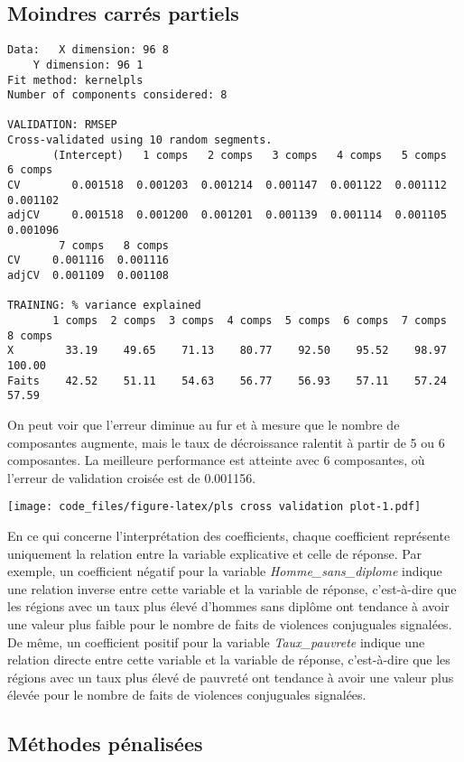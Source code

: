 \documentclass[
]{article}
\begin{document}
\hypertarget{moindres-carruxe9s-partiels}{%
\subsection{Moindres carrés
partiels}\label{moindres-carruxe9s-partiels}}

\begin{verbatim}
Data:   X dimension: 96 8 
    Y dimension: 96 1
Fit method: kernelpls
Number of components considered: 8

VALIDATION: RMSEP
Cross-validated using 10 random segments.
       (Intercept)   1 comps   2 comps   3 comps   4 comps   5 comps   6 comps
CV        0.001518  0.001203  0.001214  0.001147  0.001122  0.001112  0.001102
adjCV     0.001518  0.001200  0.001201  0.001139  0.001114  0.001105  0.001096
        7 comps   8 comps
CV     0.001116  0.001116
adjCV  0.001109  0.001108

TRAINING: % variance explained
       1 comps  2 comps  3 comps  4 comps  5 comps  6 comps  7 comps  8 comps
X        33.19    49.65    71.13    80.77    92.50    95.52    98.97   100.00
Faits    42.52    51.11    54.63    56.77    56.93    57.11    57.24    57.59
\end{verbatim}

On peut voir que l'erreur diminue au fur et à mesure que le nombre de
composantes augmente, mais le taux de décroissance ralentit à partir de
5 ou 6 composantes. La meilleure performance est atteinte avec 6
composantes, où l'erreur de validation croisée est de 0.001156.

\texttt{[image: code\_files/figure-latex/pls cross validation plot-1.pdf]}

En ce qui concerne l'interprétation des coefficients, chaque coefficient
représente uniquement la relation entre la variable explicative et celle
de réponse. Par exemple, un coefficient négatif pour la variable
\emph{Homme\_sans\_diplome} indique une relation inverse entre cette
variable et la variable de réponse, c'est-à-dire que les régions avec un
taux plus élevé d'hommes sans diplôme ont tendance à avoir une valeur
plus faible pour le nombre de faits de violences conjuguales signalées.
De même, un coefficient positif pour la variable \emph{Taux\_pauvrete}
indique une relation directe entre cette variable et la variable de
réponse, c'est-à-dire que les régions avec un taux plus élevé de
pauvreté ont tendance à avoir une valeur plus élevée pour le nombre de
faits de violences conjuguales signalées.

\hypertarget{muxe9thodes-puxe9nalisuxe9es}{%
\subsection{Méthodes pénalisées}\label{muxe9thodes-puxe9nalisuxe9es}}
\end{document}
